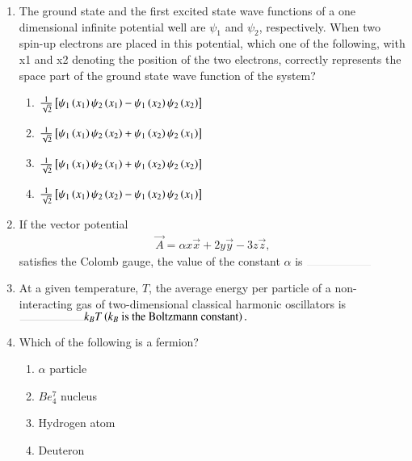 \documentclass[journal,12pt,onecolumn]{IEEEtran}
\theoremstyle{remark}
\begin{document}
\begin{enumerate}
\item The ground state and the first excited state wave functions of a one dimensional infinite potential well are $\psi_1$ and $\psi_2$, respectively. When two spin-up electrons are placed in this potential, which one of the following, with x1 and x2 denoting the position of the two electrons, correctly represents the space part of the ground state wave function of the system?
\hfill{}
\begin{enumerate}
\item $\frac{1}{\sqrt{2}}{}\left[\psi_1\left(x_1\right)\psi_2\left(x_1\right) - \psi_1\left(x_2\right)\psi_2\left(x_2\right)\right]$
\item $\frac{1}{\sqrt{2}}{}\left[\psi_1\left(x_1\right)\psi_2\left(x_2\right) + \psi_1\left(x_2\right)\psi_2\left(x_1\right)\right]$
\item $\frac{1}{\sqrt{2}}{}\left[\psi_1\left(x_1\right)\psi_2\left(x_1\right) + \psi_1\left(x_2\right)\psi_2\left(x_2\right)\right]$
\item $\frac{1}{\sqrt{2}}{}\left[\psi_1\left(x_1\right)\psi_2\left(x_2\right) - \psi_1\left(x_2\right)\psi_2\left(x_1\right)\right]$
\end{enumerate}

\item If the vector potential
\begin{align*}
\vec{A} = \alpha x\vec{x} + 2y\vec{y} - 3z\vec{z},
\end{align*}
satisfies the Colomb gauge, the value of the constant $\alpha$ is $\rule{2cm}{0.1pt}$
\hfill{}

\item At a given temperature, $T$, the average energy per particle of a non-interacting gas of two-dimensional classical harmonic oscillators is $\rule{2cm}{0.1pt} k_{B}T\brak{k_B \text{ is the Boltzmann constant}}.$
\hfill{}

\item Which of the following is a fermion?
\hfill{}
\begin{enumerate}
\item $\alpha$ particle
\item $Be_{4}^{7}$ nucleus
\item Hydrogen atom
\item Deuteron
\end{enumerate}


\end{enumerate}
\end{document}
